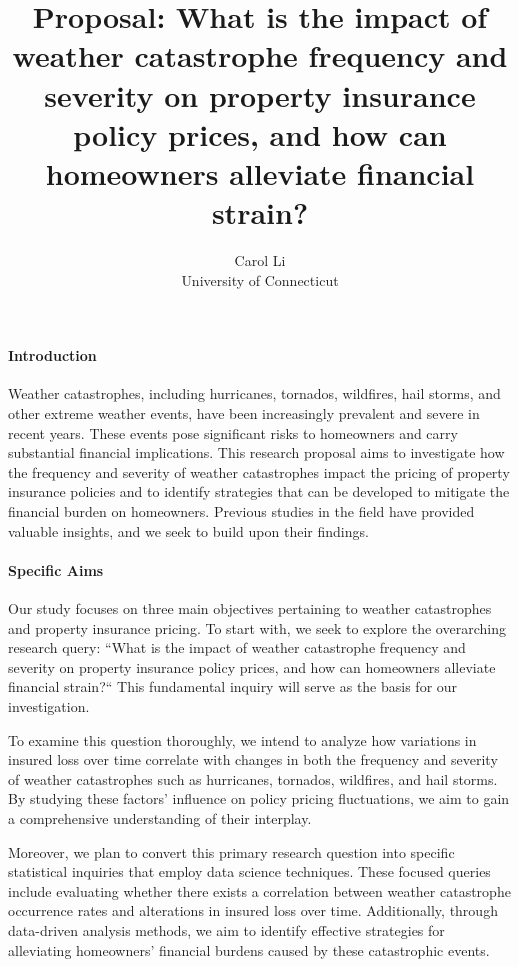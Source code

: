 \documentclass[12pt]{article}
\title{Proposal: What is the impact of weather catastrophe frequency and severity on property insurance policy 
prices, and how can homeowners alleviate financial strain?}
\author{Carol Li\\
  University of Connecticut
}
\begin{document}
\maketitle


\paragraph{Introduction}
Weather catastrophes, including hurricanes, tornados, wildfires, hail storms, and other extreme weather events, have been increasingly 
prevalent and severe in recent years. These events pose significant risks to homeowners and carry substantial financial implications. 
This research proposal aims to investigate how the frequency and severity of weather catastrophes impact the pricing of property 
insurance policies and to identify strategies that can be developed to mitigate the financial burden on homeowners. Previous studies 
in the field \citep[e.g.,][]{kraehnert2021} have provided valuable insights, and we seek to build upon their findings. 

\paragraph{Specific Aims}
Our study focuses on three main objectives pertaining to weather catastrophes and property insurance pricing. To start with, we seek 
to explore the overarching research query: ``What is the impact of weather catastrophe frequency and severity on property insurance policy 
prices, and how can homeowners alleviate financial strain?`` This fundamental inquiry will serve as the basis for our investigation.

To examine this question thoroughly, we intend to analyze how variations in insured loss over time correlate with changes in both the 
frequency and severity of weather catastrophes such as hurricanes, tornados, wildfires, and hail storms. By studying these factors' 
influence on policy pricing fluctuations, we aim to gain a comprehensive understanding of their interplay.

Moreover, we plan to convert this primary research question into specific statistical inquiries that employ data science techniques. 
These focused queries include evaluating whether there exists a correlation between weather catastrophe occurrence rates and 
alterations in insured loss over time. Additionally, through data-driven analysis methods, we aim to identify effective strategies 
for alleviating homeowners' financial burdens caused by these catastrophic events.
\end{document}
